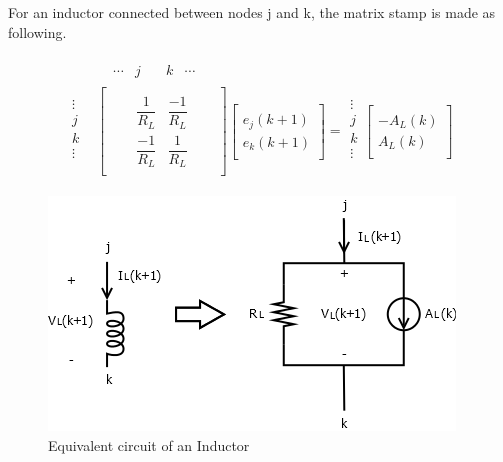 For an inductor connected between nodes j and k, the matrix stamp is made as following.

\begin{align}
\begin{split}
&
\begin{matrix}
& \cdots & j & \quad k & \cdots
\end{matrix}\\[-6pt]
\begin{matrix}
\vdots\\[6pt]
j\\[6pt]
k\\[6pt]
\vdots\\
\end{matrix}
&
\begin{bmatrix}
	\quad & \quad &  \\[6pt]
	\quad & \dfrac{1}{R_L} & \dfrac{-1}{R_L} & \quad  \\[6pt]
	\quad & \dfrac{-1}{R_L} & \dfrac{1}{R_L} & \quad \\[6pt]
	\quad &  & 
\end{bmatrix}
\begin{bmatrix}
	\quad \\[6pt]
	e_j(k+1)\\[6pt]
	e_k(k+1)\\[6pt]
	\quad
\end{bmatrix}
=
\begin{matrix}
\vdots\\[6pt]
j\\[6pt]
k\\[6pt]
\vdots\\
\end{matrix}
\begin{bmatrix}
	\quad \\[6pt]
	-A_L(k)\\[6pt]
	A_L(k)\\[6pt]
	\quad
\end{bmatrix}
\end{split}
\end{align}

\begin{figure}[ht]
	\centering
	\includegraphics[scale=0.6]{img/Inductor.png} 
	\caption{Equivalent circuit of an Inductor}
	\label{fig:Inductor}
\end{figure}

